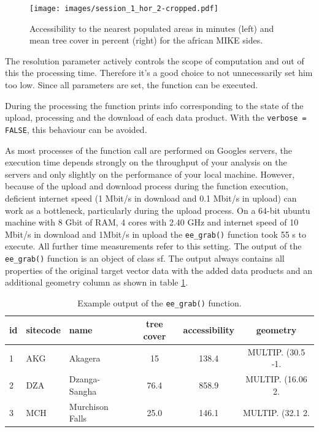 \begin{center}
	\begin{figure}
		\begin{center}
			\texttt{[image: images/session\_1\_hor\_2-cropped.pdf]}
			\caption{Accessibility to the nearest populated areas in minutes (left) and mean tree cover in percent (right) for the african MIKE sides.}
			\label{sample_session_1}
		\end{center}
	\end{figure}
\end{center}

The resolution parameter actively controls the scope of computation and out of this the processing time. Therefore it's a good choice to not unnecessarily set him too low. 
Since all parameters are set, the function can be executed. 



During the processing the function prints info corresponding to the state of the upload, processing and the download of each data product. With the \texttt{verbose = FALSE}, this behaviour can be avoided. 





As most processes of the function call are performed on Googles servers, the execution time depends strongly on the throughput of your analysis on the servers and only slightly on the performance of your local machine. However, because of the upload and download process during the function execution, deficient internet speed (1 Mbit/s in download and 0.1 Mbit/s in upload) can work as a bottleneck, particularly during the upload process. 
On a 64-bit ubuntu machine with 8 Gbit of RAM, 4 cores with 2.40 GHz and internet speed of 10 Mbit/s in download and 1Mbit/s in upload the \texttt{ee\_grab()} function took 55 s to execute. All further time measurements refer to this setting.
The output of the \texttt{ee\_grab()} function is an object of class sf.  The output always contains all properties of the original target vector data with the added data products and an additional geometry column as shown in table \ref{output}.

\begin{table}[h]
	\captionsetup{justification=raggedright,
		singlelinecheck=false
	}
	\caption{Example output of the \texttt{ee\_grab()} function.}
	\begin{tabularx}{\textwidth}{lllccc}
		\toprule
		id & sitecode & name & tree cover & accessibility & geometry \\
		\midrule
		1  & AKG  & Akagera & 15 & 138.4 & MULTIP. (30.5 -1.\\
		2 & DZA  & Dzanga-Sangha & 76.4 & 858.9 & MULTIP. (16.06 2.\\
		3 & MCH  & Murchison Falls & 25.0 & 146.1 & MULTIP. (32.1 2.\\
		\bottomrule
	\end{tabularx}

	\label{output}
\end{table}



